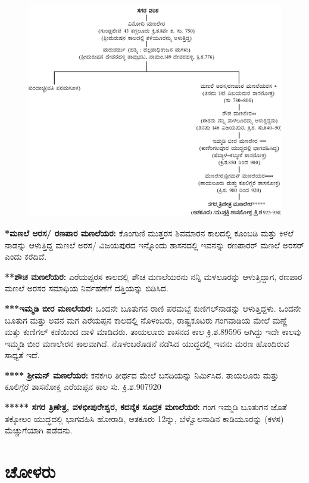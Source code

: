 \begin{figure}[H]
\includegraphics{images/chap2/1a.jpg}
\end{figure}

\textbf{*ಮಣಲೆ ಅರಸ/ ರಣಪಾರ ಮಣಲೆಯರ: } ಕೊಂಗುಣಿ ಮುತ್ತರಸ ಶಿವಮಾರನ ಕಾಲದಲ್ಲಿ ಕೂಂಬಡಿ ಮತ್ತು ಕಿಳಲೆ ನಾಡನ್ನು ಆಳುತ್ತಿದ್ದ ಮಣಲೆ ಅರಸ/ ವಿಜಯಪುರದ ಇನ್ನೊಂದು ಶಾಸನದಲ್ಲಿ ಇವನನ್ನು ರಣಪಾರರ್​ ಮಣಲೆ ಅರಸರ್​ ಎಂದು ಕರೆದಿದೆ.

\textbf{**ಶೌಚ ಮಣಲೆಯರ:} ಎರೆಯಪ್ಪರಸ ಕಾಲದಲ್ಲಿ ಶೌಚ ಮಣಲೆಯರನು ನನ್ನಿ ಮಳಲೂರನ್ನು ಆಳುತ್ತಿದ್ದಾಗ, ರಣಪಾರ ಮಣಲೆ ಅರಸರ ಸಮಾಧಿಯ ನಿರ್ವಹಣೆಗೆ ದತ್ತಿಯನ್ನು ಬಿಡಿಸಿದ.

\textbf{***ಇಮ್ಮಡಿ ಬೀರ ಮಣಲೆಯರ:} ಒಂದನೇ ಬೂತುಗನ ರಾಣಿ ಪರಮಬ್ಬೆ ಕುಣಿಗಲ್​ ನಾಡನ್ನು ಆಳುತ್ತಿದ್ದಳು. ಒಂದನೇ ಬೂತುಗ ಮತ್ತು ಅವನ ಮಗ ಎರೆಯಪ್ಪನ ಕಾಲದಲ್ಲಿ ನೊಳಂಬರು, ರಾಷ್ಟ್ರಕೂಟರು ಗಂಗವಾಡಿಯ ಮೇಲೆ ಮಣ್ಣೆ ಮತ್ತು ಕುಣಿಗಲ್​ ಕಡೆಯಿಂದ ದಾಳಿ ಮಾಡಿದರು. ತಾಯಲೂರು ಶಾಸನದ ಕಾಲ ಕ್ರಿ.ಶ.895\enginline{-}96 ಆಗಿದ್ದು ಇದೇ ಕಾಲವು ಇಮ್ಮಡಿ ಬೀರ ಮಣಲೇರನ ಕಾಲವಾಗಿದೆ. ನೊಳಂಬರೊಡನೆ ನಡೆಸಿದ ಯುದ್ಧದಲ್ಲಿ ಇವನು ಮರಣ ಹೊಂದಿರುವ ಸಾಧ್ಯತೆ ಇದೆ.

\textbf{**** ಶ‍್ರೀಮನ್​ ಮಣಲೆಯರ:} ಕನಕಗಿರಿ ತೀರ್ಥದ ಮೇಲೆ ಬಸದಿಯನ್ನು ನಿರ್ಮಿಸಿದ. ತಾಯಲೂರು ಮತ್ತು ಕೂಲಿಗ್ಗೆರೆ ಶಾಸನೋಕ್ತ ಎರೆಯಪ್ಪನ ಕಾಲ ಸು. ಕ್ರಿ.ಶ.907\enginline{-}920

\textbf{***** ಸಗರ ತ್ರಿಣೇತ್ರ, ವಳಭೀಪುರೇಶ್ವರ, ಕದನೈಕ ಸೂದ್ರಕ ಮಣಲೆಯರ:} ಗಂಗ ಇಮ್ಮಡಿ ಬೂತುಗನ ಜೊತೆ ತಕ್ಕೋಲಂ ಯುದ್ಧದಲ್ಲಿ ಭಾಗವಹಿಸಿ ಹೋರಾಡಿ, ಆತಕೂರು 12ನ್ನು, ಬೆಳ್ವೊಲನಾಡಿನ ಕಾಡಿಯೂರನ್ನು (ಕಳಸ) ಮೆಚ್ಚುಗೆಯಾಗಿ ಪಡೆದನು.


\section{ಚೋಳರು}

